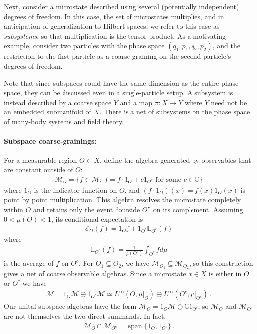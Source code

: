 \documentclass[a4paper,11pt]{article}
\theoremstyle{definition}
\newcommand{\mM}{\mathcal{M}}
\newcommand{\mE}{\mathcal{E}}
\begin{document}
Next, consider a microstate described using several (potentially independent) degrees of freedom. In this case, the set of microstates multiplies, and in anticipation of generalization to Hilbert spaces, we refer to this case as {\it subsystems}, so that multiplication is the tensor product. As a motivating example, consider two particles with the phase space $(q_1,p_1,q_2,p_2)$, and the restriction to the first particle as a coarse-graining on the second particle's degrees of freedom.

Note that since subspaces could have the same dimension as the entire phase space, they can be discussed even in a single-particle setup. A subsystem is instead described by a coarse space $Y$ and a map $\pi: X\to Y$ where $Y$ need not be an embedded submanifold of $X$. There is a net of subsystems on the phase space of many-body systems and field theory.



\paragraph{Subspace coarse-grainings:}
For a measurable region $O\subset X$, define the algebra generated by observables that are constant outside of $O$:
\begin{align}
    \mM_O=\{f\in\mM:\ f=f \cdot 1_O +c 1_{O^c}\text{ for some }c\in\mathbb C\}
\end{align}
where $1_O$ is the indicator function on $O$, and $(f\cdot 1_O)(x)=f(x)1_O(x)$ is point by point multiplication.
This algebra resolves the microstate completely within $O$ and retains only the event ``outside $O$'' on its complement. Assuming $0<\mu(O)<1$, its conditional expectation is
\begin{align}
    \mE_O(f)=1_O f+
    1_{O^c}\mathbb{E}_{O^c}(f)
\end{align}
where
\begin{align}
    \mathbb{E}_{O^c}(f)=\frac{1}{\mu(O^c)}\int_{O^c} f d\mu
\end{align}
is the average of $f$ on $O^c$.
For $O_1\subseteq O_2$, we have $\mM_{O_1}\subseteq\mM_{O_2}$, so this construction gives a net of coarse observable algebras. Since a microstate $x\in X$ is either in $O$ or $O^c$ we have
\begin{align}
    \mM=1_O\mM\oplus 1_{O^c}\mM
    \simeq L^\infty(O,\mu|_O)\oplus L^\infty(O^c,\mu|_{O^c})\ .
\end{align}
Our unital subspace algebras have the form $\mM_O=1_O\mM\oplus\mathbb C1_{O^c}$, so $\mM_O$ and $\mM_{O^c}$ are not themselves the two direct summands. In fact,
\begin{align}
    \mM_O\cap\mM_{O^c}=\operatorname{span}\{1_O,1_{O^c}\}\ .
\end{align}
\end{document}
